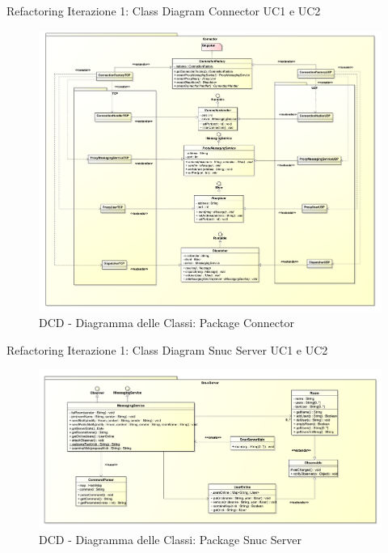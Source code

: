 \begin{frame} {Refactoring Iterazione 1: Class Diagram Connector UC1 e UC2}
   \begin{figure}
     \includegraphics[scale=0.084]{image_astah/Iteration_1_DesignModel_Refactored/ClassDiagramConnector.png}{\centering}
     \caption{DCD - Diagramma delle Classi: Package Connector }
     \label{fig_UC1_UC2_DCDR_3} 
   \end{figure}
\end{frame}

\begin{frame} {Refactoring Iterazione 1: Class Diagram Snuc Server UC1 e UC2}
   \begin{figure}
     \includegraphics[scale=0.144]{image_astah/Iteration_1_DesignModel_Refactored/ClassDiagramSnucServer.png}{\centering}
     \caption{DCD - Diagramma delle Classi: Package Snuc Server }
     \label{fig_UC1_UC2_DCDR_4} 
   \end{figure}
\end{frame}

